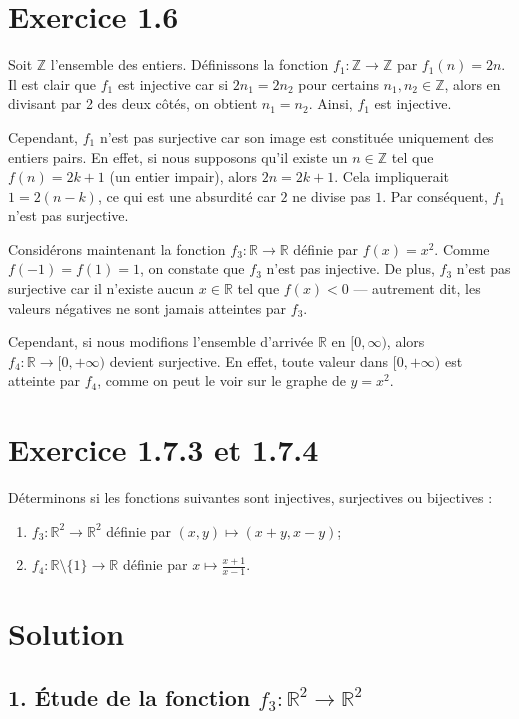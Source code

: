 \documentclass[a4paper,oneside,12pt]{amsbook}
\theoremstyle{definition}
\theoremstyle{remark}
\begin{document}
\section*{Exercice 1.6}
Soit $\mathbb{Z}$ l'ensemble des entiers. Définissons la fonction $f_1 : \mathbb{Z} \to \mathbb{Z}$ par $f_1(n) = 2n$. Il est clair que $f_1$ est injective car si $2n_1 = 2n_2$ pour certains $n_1, n_2 \in \mathbb{Z}$, alors en divisant par 2 des deux côtés, on obtient $n_1 = n_2$. Ainsi, $f_1$ est injective.

Cependant, $f_1$ n'est pas surjective car son image est constituée uniquement des entiers pairs. En effet, si nous supposons qu'il existe un $n \in \mathbb{Z}$ tel que $f(n) = 2k+1$ (un entier impair), alors $2n = 2k + 1$. Cela impliquerait $1 = 2(n - k)$, ce qui est une absurdité car $2$ ne divise pas $1$. Par conséquent, $f_1$ n'est pas surjective.

Considérons maintenant la fonction $f_3 : \mathbb{R} \to \mathbb{R}$ définie par $f(x) = x^2$. Comme $f(-1) = f(1) = 1$, on constate que $f_3$ n'est pas injective. De plus, $f_3$ n'est pas surjective car il n'existe aucun $x \in \mathbb{R}$ tel que $f(x) < 0$ — autrement dit, les valeurs négatives ne sont jamais atteintes par $f_3$.

Cependant, si nous modifions l'ensemble d'arrivée $\mathbb{R}$ en $[0, \infty)$, alors $f_4 : \mathbb{R} \to [0, +\infty)$ devient surjective. En effet, toute valeur dans $[0, +\infty)$ est atteinte par $f_4$, comme on peut le voir sur le graphe de $y = x^2$.

\section*{Exercice 1.7.3 et 1.7.4}
Déterminons si les fonctions suivantes sont injectives, surjectives ou bijectives :
\begin{enumerate}
    \item $f_3: \mathbb{R}^2 \to \mathbb{R}^2$ définie par $(x,y) \mapsto (x+y, x-y)$;
    \item $f_4: \mathbb{R} \setminus \{1\} \to \mathbb{R}$ définie par $x \mapsto \frac{x+1}{x-1}$.
\end{enumerate}
\section*{Solution}

\subsection*{1. Étude de la fonction $f_3 : \mathbb{R}^2 \to \mathbb{R}^2$}
\end{document}
